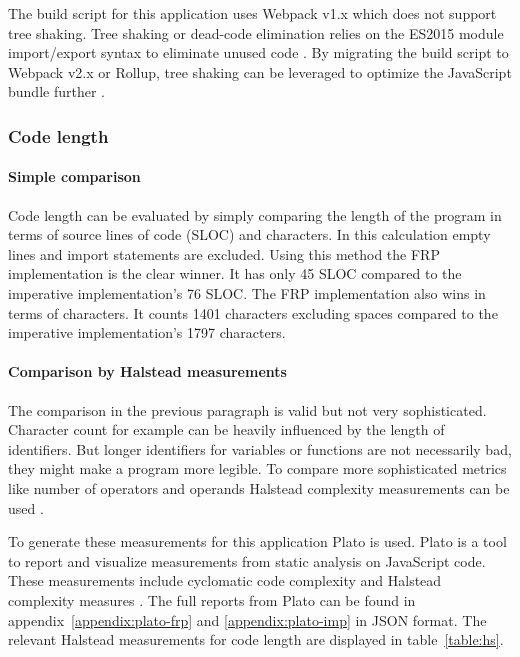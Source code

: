 The build script for this application uses Webpack v1.x which does not support tree shaking. Tree shaking or dead-code elimination relies on the ES2015 module import/export syntax to eliminate unused code \cite{tree-webpack}. By migrating the build script to Webpack v2.x or Rollup, tree shaking can be leveraged to optimize the JavaScript bundle further \cite{tree-webpack}\cite{tree-rollup}.

\subsubsection{Code length}

\paragraph{Simple comparison}\mbox{}

Code length can be evaluated by simply comparing the length of the program in terms of source lines of code (SLOC) and characters. In this calculation empty lines and import statements are excluded. Using this method the FRP implementation is the clear winner. It has only 45 SLOC compared to the imperative implementation's 76 SLOC. The FRP implementation also wins in terms of characters. It counts 1401 characters excluding spaces compared to the imperative implementation's 1797 characters.

\paragraph{Comparison by Halstead measurements}\mbox{}

The comparison in the previous paragraph is valid but not very sophisticated. Character count for example can be heavily influenced by the length of identifiers. But longer identifiers for variables or functions are not necessarily bad, they might make a program more legible. To compare more sophisticated metrics like number of operators and operands Halstead complexity measurements can be used \cite{zuse-halstead}.

To generate these measurements for this application Plato is used. Plato is a tool to report and visualize measurements from static analysis on JavaScript code. These measurements include cyclomatic code complexity and Halstead complexity measures \cite{plato}. The full reports from Plato can be found in appendix~\ref{appendix:plato-frp} and \ref{appendix:plato-imp} in JSON format. The relevant Halstead measurements for code length are displayed in table~\ref{table:hs}.

